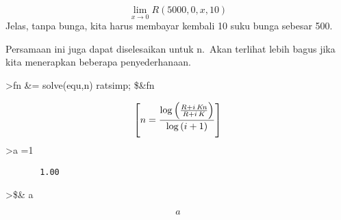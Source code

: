 \documentclass[
]{book}
\begin{document}
\[\lim_{x\rightarrow 0}{R\left(5000 , 0 , x , 10\right)}\]Jelas, tanpa bunga, kita harus membayar kembali 10 suku bunga sebesar 500.

Persamaan ini juga dapat diselesaikan untuk n.~Akan terlihat lebih bagus jika kita menerapkan beberapa penyederhanaan.

\textgreater fn \&= solve(equ,n) \textbar{} ratsimp; \$\&fn

\[\left[ n=\frac{\log \left(\frac{R+i\,{\it Kn}}{R+i\,K}\right)}{ \log \left(i+1\right)} \right]\]\textgreater a =1

\begin{verbatim}
       1.00 
\end{verbatim}

\textgreater\$\& a

\[a\]

\backmatter
\end{document}
